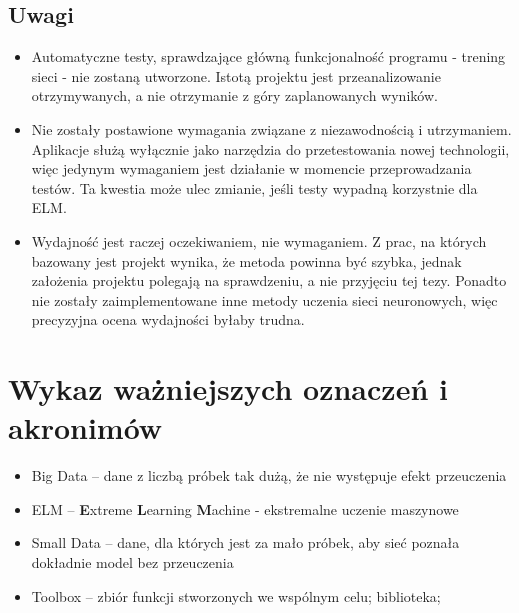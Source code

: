 \documentclass{article}
\begin{document}
\subsection{Uwagi}
\begin{itemize}
\item Automatyczne testy, sprawdzające główną funkcjonalność programu - trening sieci - nie zostaną utworzone. Istotą projektu jest przeanalizowanie otrzymywanych, a nie otrzymanie z góry zaplanowanych wyników.
\item Nie zostały postawione wymagania związane z niezawodnością i utrzymaniem. Aplikacje służą wyłącznie jako narzędzia do przetestowania nowej technologii, więc jedynym wymaganiem jest działanie w momencie przeprowadzania testów. Ta kwestia może ulec zmianie, jeśli testy wypadną korzystnie dla ELM.
\item Wydajność jest raczej oczekiwaniem, nie wymaganiem. Z prac, na których bazowany jest projekt wynika, że metoda powinna być szybka, jednak założenia projektu polegają na sprawdzeniu, a nie przyjęciu tej tezy. Ponadto nie zostały zaimplementowane inne metody uczenia sieci neuronowych, więc precyzyjna ocena wydajności byłaby trudna.
\end{itemize}
\clearpage
\section{Wykaz ważniejszych oznaczeń i akronimów}
\begin{itemize}[label={},leftmargin=*]
\item Big Data -- dane z liczbą próbek tak dużą, że nie występuje efekt przeuczenia
\item ELM -- \textbf{E}xtreme \textbf{L}earning \textbf{M}achine - ekstremalne uczenie maszynowe
\item Small Data -- dane, dla których jest za mało próbek, aby sieć poznała dokładnie model bez przeuczenia
\item Toolbox -- zbiór funkcji stworzonych we wspólnym celu; biblioteka;
\end{itemize}
\end{document}
